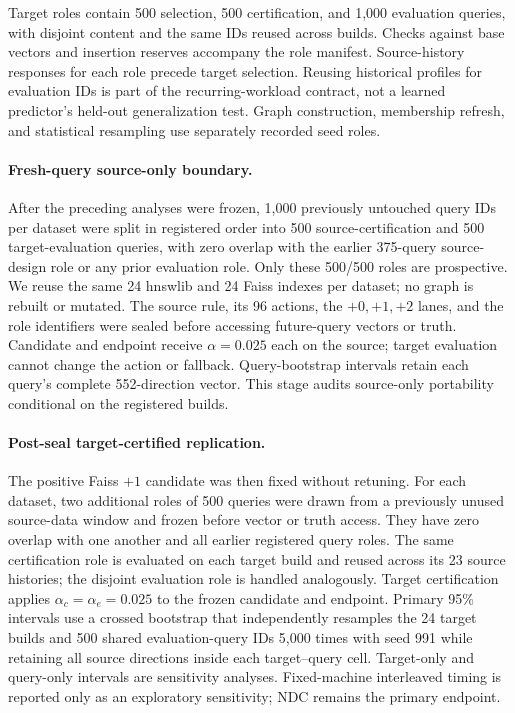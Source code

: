 Target roles contain 500 selection, 500 certification, and 1,000 evaluation queries, with disjoint content and the same IDs reused across builds. Checks against base vectors and insertion reserves accompany the role manifest. Source-history responses for each role precede target selection. Reusing historical profiles for evaluation IDs is part of the recurring-workload contract, not a learned predictor's held-out generalization test. Graph construction, membership refresh, and statistical resampling use separately recorded seed roles.

\paragraph{Fresh-query source-only boundary.}
After the preceding analyses were frozen, 1,000 previously untouched query IDs per dataset were split in registered order into 500 source-certification and 500 target-evaluation queries, with zero overlap with the earlier 375-query source-design role or any prior evaluation role. Only these 500/500 roles are prospective. We reuse the same 24 hnswlib and 24 Faiss indexes per dataset; no graph is rebuilt or mutated. The source rule, its 96 actions, the $+0,+1,+2$ lanes, and the role identifiers were sealed before accessing future-query vectors or truth. Candidate and endpoint receive $\alpha=0.025$ each on the source; target evaluation cannot change the action or fallback. Query-bootstrap intervals retain each query's complete 552-direction vector. This stage audits source-only portability conditional on the registered builds.

\paragraph{Post-seal target-certified replication.}
The positive Faiss $+1$ candidate was then fixed without retuning. For each dataset, two additional roles of 500 queries were drawn from a previously unused source-data window and frozen before vector or truth access. They have zero overlap with one another and all earlier registered query roles. The same certification role is evaluated on each target build and reused across its 23 source histories; the disjoint evaluation role is handled analogously. Target certification applies $\alpha_c=\alpha_e=0.025$ to the frozen candidate and endpoint. Primary 95\% intervals use a crossed bootstrap that independently resamples the 24 target builds and 500 shared evaluation-query IDs 5,000 times with seed 991 while retaining all source directions inside each target--query cell. Target-only and query-only intervals are sensitivity analyses. Fixed-machine interleaved timing is reported only as an exploratory sensitivity; NDC remains the primary endpoint.

